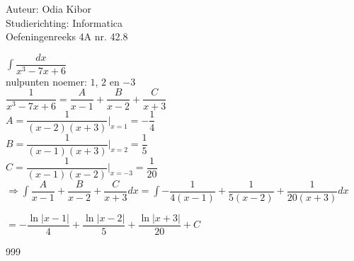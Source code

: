 \documentclass[a4paper]{article}
\begin{document}
  
\noindent \large Auteur: Odia Kibor \\
\noindent \large Studierichting: Informatica\\
\noindent \large Oefeningenreeks 4A nr. 42.8\\

\medskip

\normalsize


$ \displaystyle\int \dfrac{dx}{x^3-7x+6} $\\

nulpunten noemer: $1$, $2$ en $-3$\\

$ \dfrac{1}{x^3-7x+6} = \dfrac{A}{x - 1} + \dfrac{B}{x - 2} + \dfrac{C}{x + 3}$\\
 
$ A =\dfrac{1}{(x - 2)(x + 3)}\bigg|_{x = 1} = -\dfrac{1}{4} $\\

$ B =\dfrac{1}{(x - 1)(x + 3)}\bigg|_{x = 2} = \dfrac{1}{5} $\\

$ C =\dfrac{1}{(x - 1)(x - 2)}\bigg|_{x = -3} = \dfrac{1}{20} $\\

$\Rightarrow \displaystyle\int \dfrac{A}{x - 1} + \dfrac{B}{x - 2} + \dfrac{C}{x + 3} dx = \displaystyle\int -\dfrac{1}{4(x - 1)} + \dfrac{1}{5(x - 2)} + \dfrac{1}{20(x + 3)} dx$

$ = -\dfrac{\ln|x - 1|}{4} + \dfrac{\ln|x - 2|}{5} + \dfrac{\ln|x + 3|}{20} + C $\\


















\begin{thebibliography}{999}
\end{thebibliography}
\end{document}
